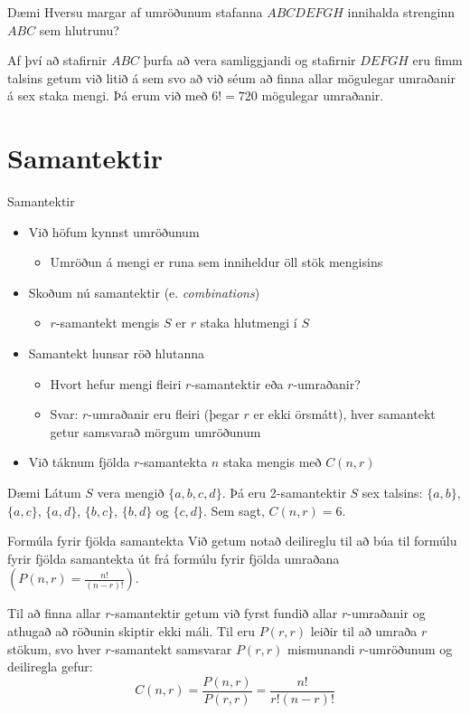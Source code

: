 \documentclass[handout]{beamer}
\begin{document}
\begin{frame}{Dæmi}
Hversu margar af umröðunum stafanna $ABCDEFGH$ innihalda strenginn $ABC$ sem hlutrunu? \pause

Af því að stafirnir $ABC$ þurfa að vera samliggjandi og stafirnir $DEFGH$ eru fimm talsins getum við litið á sem svo að við séum að finna allar mögulegar umraðanir á sex staka mengi. Þá erum við með $6! = 720$ mögulegar umraðanir.
\end{frame}

\section{Samantektir}

\begin{frame}{Samantektir}
\begin{itemize}
 \item Við höfum kynnst umröðunum
 \begin{itemize}
  \item Umröðun á mengi er runa sem inniheldur öll stök mengisins
 \end{itemize}
 \item Skoðum nú samantektir (e. \emph{combinations})
 \begin{itemize}
  \item $r$-samantekt mengis $S$ er $r$ staka hlutmengi í $S$
 \end{itemize}
 \item Samantekt hunsar röð hlutanna
 \begin{itemize}
    \item Hvort hefur mengi fleiri $r$-samantektir eða $r$-umraðanir? \pause
    \item Svar: $r$-umraðanir eru fleiri (þegar $r$ er ekki örsmátt), hver samantekt getur samsvarað mörgum umröðunum
 \end{itemize}
 \item Við táknum fjölda $r$-samantekta $n$ staka mengis með $C(n,r)$
\end{itemize}
\end{frame}

\begin{frame}{Dæmi}
Látum $S$ vera mengið $\{a, b, c, d\}$. Þá eru 2-samantektir $S$ sex talsins: $\{a, b\}$, $\{a, c\}$, $\{a, d\}$, $\{b, c\}$, $\{b, d\}$ og $\{c, d\}$. Sem sagt, $C(n, r) = 6$.
\end{frame}

\begin{frame}{Formúla fyrir fjölda samantekta}
Við getum notað deilireglu til að búa til formúlu fyrir fjölda samantekta út frá formúlu fyrir fjölda umraðana $\left(P(n,r) = \frac{n!}{(n-r)!}\right)$.

Til að finna allar $r$-samantektir getum við fyrst fundið allar $r$-umraðanir og athugað að röðunin skiptir ekki máli. Til eru $P(r,r)$ leiðir til að umraða $r$ stökum, svo hver $r$-samantekt samsvarar $P(r,r)$ mismunandi $r$-umröðunum og deiliregla gefur:
\[
 C(n,r) = \frac{P(n,r)}{P(r,r)} = \frac{n!}{r!(n-r)!}
\]
\end{frame}
\end{document}
